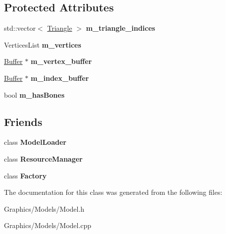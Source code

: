 \subsection*{Protected Attributes}
\begin{DoxyCompactItemize}
\item 
\mbox{\label{classModel_a51e447ea04f6d3bf69c1c202329ee2b8}} 
std\+::vector$<$ \hyperlink{structModel_1_1Triangle}{Triangle} $>$ {\bfseries m\+\_\+triangle\+\_\+indices}
\item 
\mbox{\label{classModel_a982acd4df21f2fb90d583a11936a78ca}} 
Vertices\+List {\bfseries m\+\_\+vertices}
\item 
\mbox{\label{classModel_a295c0501a70eefeaf1f229ed8b40ec20}} 
\hyperlink{classBuffer}{Buffer} $\ast$ {\bfseries m\+\_\+vertex\+\_\+buffer}
\item 
\mbox{\label{classModel_a3e9022d69f8be6082af1435b0874fba2}} 
\hyperlink{classBuffer}{Buffer} $\ast$ {\bfseries m\+\_\+index\+\_\+buffer}
\item 
\mbox{\label{classModel_aee6bb51234b290c65fce759602a624c9}} 
bool {\bfseries m\+\_\+has\+Bones}
\end{DoxyCompactItemize}
\subsection*{Friends}
\begin{DoxyCompactItemize}
\item 
\mbox{\label{classModel_ac22dade55c1e8f81ea3e0892cd321190}} 
class {\bfseries Model\+Loader}
\item 
\mbox{\label{classModel_a54c1252abc87a78a301e6b6984470408}} 
class {\bfseries Resource\+Manager}
\item 
\mbox{\label{classModel_a328c093d609680cca505905c6d49901a}} 
class {\bfseries Factory}
\end{DoxyCompactItemize}


The documentation for this class was generated from the following files\+:\begin{DoxyCompactItemize}
\item 
Graphics/\+Models/Model.\+h\item 
Graphics/\+Models/Model.\+cpp\end{DoxyCompactItemize}
